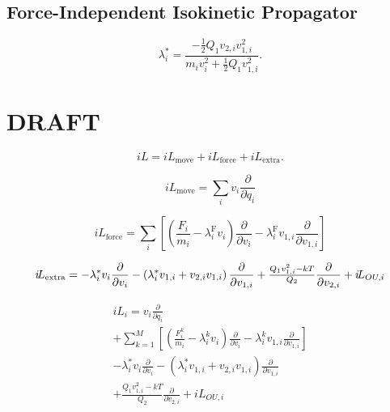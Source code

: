\documentclass[
    journal=jctcce,
    layout=twocolumn
]{achemso}
\newcommand{\diff}[2]{\frac{\partial #2}{\partial #1}} %
\newcommand{\dof}{i}   %
\newcommand{\Liu}{i\!L}
\begin{document}
\subsection{Force-Independent Isokinetic Propagator}

\begin{equation}
\lambda^\ast_\dof = \frac{- \frac{1}{2} Q_1 v_{2,\dof} v_{1,\dof}^2}{m_\dof v_\dof^2 + \frac{1}{2} Q_1 v_{1,\dof}^2}.
\end{equation}


\section{DRAFT}




\begin{equation}
\Liu = \Liu_\mathrm{move} + \Liu_\mathrm{force} + \Liu_\mathrm{extra}.
\end{equation}

\begin{equation}
\Liu_\mathrm{move} = \sum_\dof v_\dof\diff{q_\dof}{}
\end{equation}

\begin{equation}
\Liu_\mathrm{force} = \sum_\dof \left[ \left(\frac{F_\dof}{m_\dof} - \lambda^\mathrm{F}_\dof v_\dof\right)\diff{v_\dof}{} - \lambda^\mathrm{F}_\dof v_{1,\dof}\diff{v_{1,\dof}}{} \right]
\end{equation}

\begin{equation}
\Liu_\mathrm{extra} = - \lambda^\ast_\dof v_\dof\diff{v_\dof}{} - \left(\lambda^\ast_\dof v_{1,\dof} + v_{2,\dof} v_{1,\dof}\right)\diff{v_{1,\dof}}{} \\
+ \tfrac{Q_1 v_{1,\dof}^2 - kT}{Q_2}\diff{v_{2,\dof}}{}
+ \Liu_{OU,\dof}
\end{equation}

\begin{multline}
\Liu_\dof = v_\dof\diff{q_\dof}{} \\
+ \sum_{k=1}^M \left[ \left(\frac{F^k_\dof}{m_\dof} - \lambda^k_\dof v_\dof\right)\diff{v_\dof}{} - \lambda^k_\dof v_{1,\dof}\diff{v_{1,\dof}}{} \right] \\
- \lambda^\ast_\dof v_\dof\diff{v_\dof}{} - \left(\lambda^\ast_\dof v_{1,\dof} + v_{2,\dof} v_{1,\dof}\right)\diff{v_{1,\dof}}{} \\
+ \tfrac{Q_1 v_{1,\dof}^2 - kT}{Q_2}\diff{v_{2,\dof}}{}
+ \Liu_{OU,\dof}
\end{multline}
\end{document}
